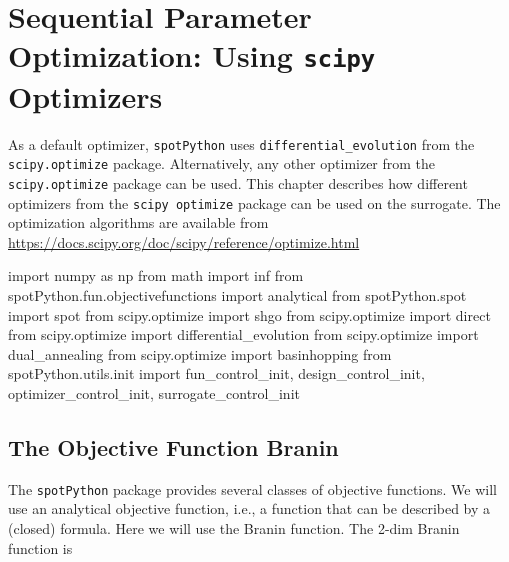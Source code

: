 \documentclass[
  letterpaper,
  DIV=11,
  numbers=noendperiod]{scrreprt}
\newenvironment{Shaded}{\begin{snugshade}}{\end{snugshade}}
\newcommand{\ImportTok}[1]{\textcolor[rgb]{0.00,0.46,0.62}{#1}}
\newcommand{\NormalTok}[1]{\textcolor[rgb]{0.00,0.23,0.31}{#1}}
\begin{document}
\chapter{\texorpdfstring{Sequential Parameter Optimization: Using
\texttt{scipy}
Optimizers}{Sequential Parameter Optimization: Using scipy Optimizers}}\label{sec-scipy-optimizers}

As a default optimizer, \texttt{spotPython} uses
\texttt{differential\_evolution} from the \texttt{scipy.optimize}
package. Alternatively, any other optimizer from the
\texttt{scipy.optimize} package can be used. This chapter describes how
different optimizers from the \texttt{scipy\ optimize} package can be
used on the surrogate. The optimization algorithms are available from
\url{https://docs.scipy.org/doc/scipy/reference/optimize.html}

\begin{Shaded}
\begin{Highlighting}[]
\ImportTok{import}\NormalTok{ numpy }\ImportTok{as}\NormalTok{ np}
\ImportTok{from}\NormalTok{ math }\ImportTok{import}\NormalTok{ inf}
\ImportTok{from}\NormalTok{ spotPython.fun.objectivefunctions }\ImportTok{import}\NormalTok{ analytical}
\ImportTok{from}\NormalTok{ spotPython.spot }\ImportTok{import}\NormalTok{ spot}
\ImportTok{from}\NormalTok{ scipy.optimize }\ImportTok{import}\NormalTok{ shgo}
\ImportTok{from}\NormalTok{ scipy.optimize }\ImportTok{import}\NormalTok{ direct}
\ImportTok{from}\NormalTok{ scipy.optimize }\ImportTok{import}\NormalTok{ differential\_evolution}
\ImportTok{from}\NormalTok{ scipy.optimize }\ImportTok{import}\NormalTok{ dual\_annealing}
\ImportTok{from}\NormalTok{ scipy.optimize }\ImportTok{import}\NormalTok{ basinhopping}
\ImportTok{from}\NormalTok{ spotPython.utils.init }\ImportTok{import}\NormalTok{ fun\_control\_init, design\_control\_init, optimizer\_control\_init, surrogate\_control\_init}
\end{Highlighting}
\end{Shaded}

\section{The Objective Function
Branin}\label{the-objective-function-branin}

The \texttt{spotPython} package provides several classes of objective
functions. We will use an analytical objective function, i.e., a
function that can be described by a (closed) formula. Here we will use
the Branin function. The 2-dim Branin function is
\end{document}
